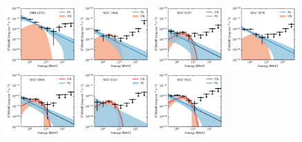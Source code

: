 \documentclass[doublespace,nopageskip]{VTthesis} %
\begin{document}
\begin{appendices}
\begin{figure}
\centering
\includegraphics[width=0.24\textwidth]{Figures/Globular/spectra/2comp_0.pdf}
\includegraphics[width=0.24\textwidth]{Figures/Globular/spectra/2comp_4.pdf}
\includegraphics[width=0.24\textwidth]{Figures/Globular/spectra/2comp_16.pdf}
\includegraphics[width=0.24\textwidth]{Figures/Globular/spectra/2comp_26.pdf}
\includegraphics[width=0.24\textwidth]{Figures/Globular/spectra/2comp_7.pdf}
\includegraphics[width=0.24\textwidth]{Figures/Globular/spectra/2comp_14.pdf}
\includegraphics[width=0.24\textwidth]{Figures/Globular/spectra/2comp_21.pdf}

\end{figure}
\end{appendices}
\end{document}
